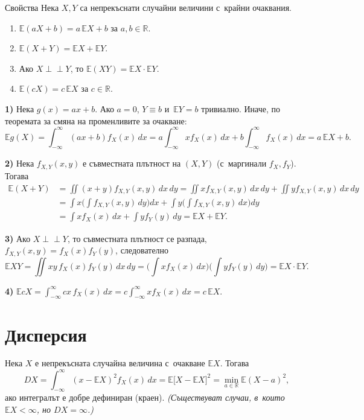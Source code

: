 \begin{thmbox}{Свойства}
Нека $X,Y$ са непрекъснати случайни величини с~крайни очаквания.
\begin{enumerate}[label=\arabic*)]
  \item $\mathbb E(aX+b) = a\,\mathbb EX+b$ за $a,b\in\mathbb R$.
  \item $\mathbb E(X+Y) = \mathbb EX+\mathbb EY$.
  \item Ако $X\perp\!\!\!\perp Y$, то $\mathbb E(XY)=\mathbb EX\cdot\mathbb EY$.
  \item $\mathbb E(cX) = c\,\mathbb EX$ за $c\in\mathbb R$.
\end{enumerate}
\end{thmbox}

\begin{proofbox}
\textbf{1)} Нека $g(x)=ax+b$. Ако $a=0$, $Y\equiv b$ и~$\mathbb EY=b$
тривиално. Иначе, по теоремата за смяна на променливите за очакване:
\[
  \mathbb Eg(X) = \int_{-\infty}^{\infty}(ax+b)f_X(x)\,dx = a\int_{-\infty}^{\infty}xf_X(x)\,dx + b\int_{-\infty}^{\infty}f_X(x)\,dx = a\,\mathbb EX+b.
\]

\textbf{2)} Нека $f_{X,Y}(x,y)$ е съвместната плътност на $(X,Y)$
(с~маргинали $f_X,f_Y$). Тогава
\begin{align*}
  \mathbb E(X+Y) &= \iint (x+y)f_{X,Y}(x,y)\,dx\,dy = \iint x f_{X,Y}(x,y)\,dx\,dy + \iint y f_{X,Y}(x,y)\,dx\,dy\\
  &= \int x\Big(\int f_{X,Y}(x,y)\,dy\Big)dx + \int y\Big(\int f_{X,Y}(x,y)\,dx\Big)dy\\
  &= \int x f_X(x)\,dx + \int y f_Y(y)\,dy = \mathbb EX+\mathbb EY.
\end{align*}

\textbf{3)} Ако $X\perp\!\!\!\perp Y$, то съвместната плътност се
разпада, $f_{X,Y}(x,y)=f_X(x)f_Y(y)$, следователно
\[
  \mathbb EXY = \iint xy\,f_X(x)f_Y(y)\,dx\,dy = \Big(\int xf_X(x)\,dx\Big)\Big(\int yf_Y(y)\,dy\Big) = \mathbb EX\cdot\mathbb EY.
\]

\textbf{4)} $\mathbb EcX = \int_{-\infty}^{\infty} cx\,f_X(x)\,dx = c\int_{-\infty}^{\infty}xf_X(x)\,dx = c\,\mathbb EX$. \qedbg
\end{proofbox}

\section{Дисперсия}

\begin{defbox}
Нека $X$ е непрекъсната случайна величина с~очакване $\mathbb EX$.
Тогава
\[
  DX = \int_{-\infty}^{\infty} (x-\mathbb EX)^2 f_X(x)\,dx = \mathbb E\big[X-\mathbb EX\big]^2 = \min_{a\in\mathbb R}\mathbb E(X-a)^2,
\]
ако интегралът е добре дефиниран (краен). \emph{(Съществуват случаи,
в~които $\mathbb EX<\infty$, но $DX=\infty$.)}
\end{defbox}

